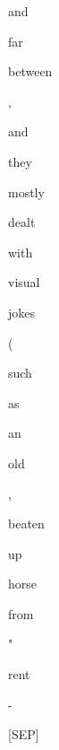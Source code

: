 \documentclass[varwidth=150mm]{standalone}
\begin{document}
\begin{CJK*}{UTF8}{gbsn}
{{{\colorbox{red!2.0696160793304443}{\strut and} \colorbox{red!0.0}{\strut far} \colorbox{red!1.0914868116378784}{\strut between} \colorbox{red!0.0}{\strut ,} \colorbox{red!4.570803642272949}{\strut and} \colorbox{red!7.822495937347412}{\strut they} \colorbox{red!6.096109867095947}{\strut mostly} \colorbox{red!2.926318645477295}{\strut dealt} \colorbox{red!1.1723213195800781}{\strut with} \colorbox{red!4.027279376983643}{\strut visual} \colorbox{red!3.6135077476501465}{\strut jokes} \colorbox{red!2.912788152694702}{\strut (} \colorbox{red!3.1696617603302}{\strut such} \colorbox{red!5.190799236297607}{\strut as} \colorbox{red!2.6611666679382324}{\strut an} \colorbox{red!0.0}{\strut old} \colorbox{red!2.686445474624634}{\strut ,} \colorbox{red!1.6738574504852295}{\strut beaten} \colorbox{red!0.0}{\strut up} \colorbox{red!17.3864803314209}{\strut horse} \colorbox{red!2.8550920486450195}{\strut from} \colorbox{red!15.044510841369629}{\strut "} \colorbox{red!100.0}{\strut rent} \colorbox{red!48.68930435180664}{\strut -} \colorbox{red!0.0}{\strut [SEP]}
}}}
\end{CJK*}
\end{document}
